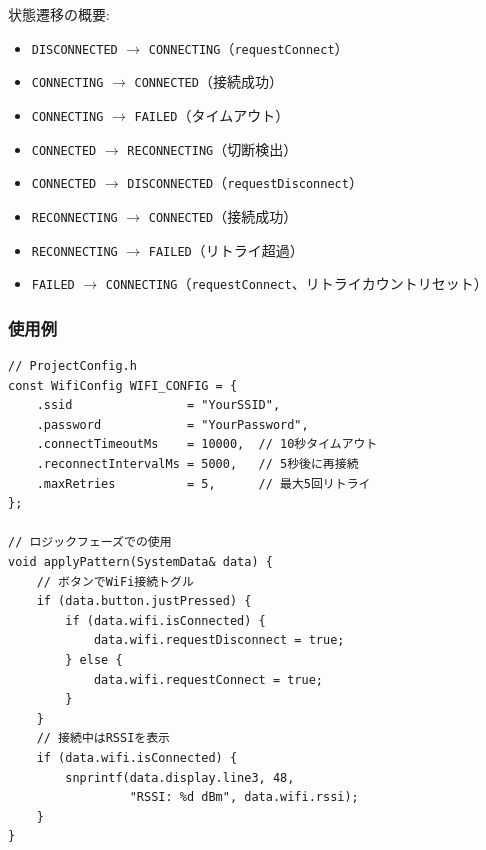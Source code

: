 \begin{notebox}[ステートマシン遷移]
状態遷移の概要:

\begin{itemize}
    \item \texttt{DISCONNECTED} $\rightarrow$ \texttt{CONNECTING}（\texttt{requestConnect}）
    \item \texttt{CONNECTING} $\rightarrow$ \texttt{CONNECTED}（接続成功）
    \item \texttt{CONNECTING} $\rightarrow$ \texttt{FAILED}（タイムアウト）
    \item \texttt{CONNECTED} $\rightarrow$ \texttt{RECONNECTING}（切断検出）
    \item \texttt{CONNECTED} $\rightarrow$ \texttt{DISCONNECTED}（\texttt{requestDisconnect}）
    \item \texttt{RECONNECTING} $\rightarrow$ \texttt{CONNECTED}（接続成功）
    \item \texttt{RECONNECTING} $\rightarrow$ \texttt{FAILED}（リトライ超過）
    \item \texttt{FAILED} $\rightarrow$ \texttt{CONNECTING}（\texttt{requestConnect}、リトライカウントリセット）
\end{itemize}
\end{notebox}

\subsubsection{使用例}

\begin{lstlisting}[style=cppstyle, caption={WifiModuleの使用例}]
// ProjectConfig.h
const WifiConfig WIFI_CONFIG = {
    .ssid                = "YourSSID",
    .password            = "YourPassword",
    .connectTimeoutMs    = 10000,  // 10秒タイムアウト
    .reconnectIntervalMs = 5000,   // 5秒後に再接続
    .maxRetries          = 5,      // 最大5回リトライ
};

// ロジックフェーズでの使用
void applyPattern(SystemData& data) {
    // ボタンでWiFi接続トグル
    if (data.button.justPressed) {
        if (data.wifi.isConnected) {
            data.wifi.requestDisconnect = true;
        } else {
            data.wifi.requestConnect = true;
        }
    }
    // 接続中はRSSIを表示
    if (data.wifi.isConnected) {
        snprintf(data.display.line3, 48,
                 "RSSI: %d dBm", data.wifi.rssi);
    }
}
\end{lstlisting}
